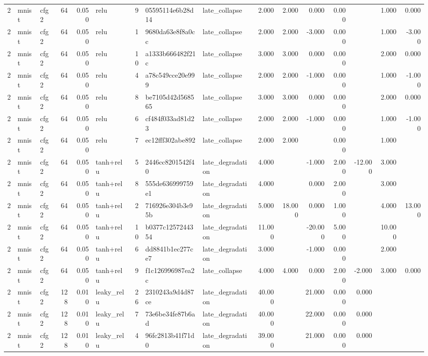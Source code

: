 \begin{table}[htbp]
{\begin{tabular}{@{}rllrrlrllrrrrrrr@{}}
2 & mnist & cfg2 & 64 & 0.050 & relu & 9 & 05595114e6b28d14 & late\_collapse & 2.000 & 2.000 & 0.000 & 0.000 &  & 1.000 & 0.000 \\
2 & mnist & cfg2 & 64 & 0.050 & relu & 1 & 9680da63e8f8a0cc & late\_collapse & 2.000 & 2.000 & -3.000 & 0.000 &  & 1.000 & -3.000 \\
2 & mnist & cfg2 & 64 & 0.050 & relu & 10 & a1333b666482f21c & late\_collapse & 3.000 & 3.000 & 0.000 & 0.000 &  & 2.000 & 0.000 \\
2 & mnist & cfg2 & 64 & 0.050 & relu & 4 & a78c549cce20e999 & late\_collapse & 2.000 & 2.000 & -1.000 & 0.000 &  & 1.000 & -1.000 \\
2 & mnist & cfg2 & 64 & 0.050 & relu & 8 & be7105d42d568565 & late\_collapse & 3.000 & 3.000 & 0.000 & 0.000 &  & 2.000 & 0.000 \\
2 & mnist & cfg2 & 64 & 0.050 & relu & 6 & cf484f033ad81d23 & late\_collapse & 2.000 & 2.000 & -1.000 & 0.000 &  & 1.000 & -1.000 \\
2 & mnist & cfg2 & 64 & 0.050 & relu & 7 & ec12fff302abe892 & late\_collapse & 2.000 & 2.000 &  & 0.000 &  & 1.000 &  \\
2 & mnist & cfg2 & 64 & 0.050 & tanh+relu & 5 & 2446cc8201542f40 & late\_degradation & 4.000 &  & -1.000 & 2.000 & -12.000 & 3.000 &  \\
2 & mnist & cfg2 & 64 & 0.050 & tanh+relu & 8 & 555de636999759e1 & late\_degradation & 4.000 &  & 0.000 & 2.000 &  & 3.000 &  \\
2 & mnist & cfg2 & 64 & 0.050 & tanh+relu & 2 & 716926e304b3e95b & late\_degradation & 5.000 & 18.000 & 0.000 & 1.000 &  & 4.000 & 13.000 \\
2 & mnist & cfg2 & 64 & 0.050 & tanh+relu & 10 & b0377c1257244354 & late\_degradation & 11.000 &  & -20.000 & 5.000 &  & 10.000 &  \\
2 & mnist & cfg2 & 64 & 0.050 & tanh+relu & 6 & dd8841b1ec277ce7 & late\_degradation & 3.000 &  & -1.000 & 0.000 &  & 2.000 &  \\
2 & mnist & cfg2 & 64 & 0.050 & tanh+relu & 9 & f1c126996987ea2c & late\_collapse & 4.000 & 4.000 & 0.000 & 2.000 & -2.000 & 3.000 & 0.000 \\
2 & mnist & cfg2 & 128 & 0.010 & leaky\_relu & 26 & 2310243a9d4d87ce & late\_degradation & 40.000 &  & 21.000 & 0.000 & 0.000 &  &  \\
2 & mnist & cfg2 & 128 & 0.010 & leaky\_relu & 7 & 73e6be34fe87b6ad & late\_degradation & 40.000 &  & 22.000 & 0.000 & 0.000 &  &  \\
2 & mnist & cfg2 & 128 & 0.010 & leaky\_relu & 4 & 96fc2813b41f71d0 & late\_degradation & 39.000 &  & 21.000 & 0.000 & 0.000 &  &  \\

\end{tabular}}
\end{table}

